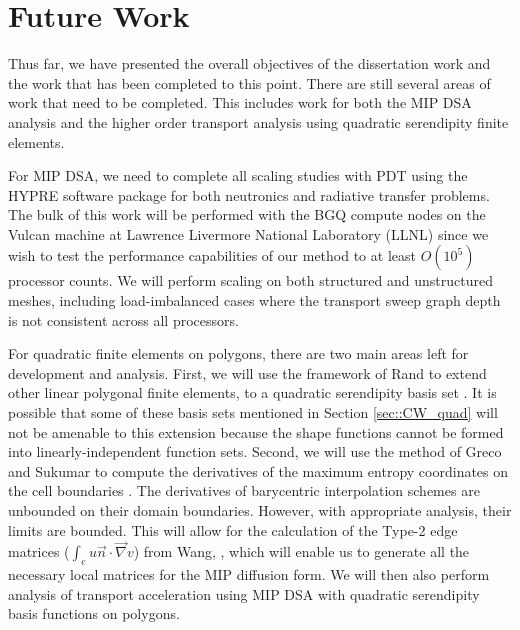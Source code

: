 \documentclass[11pt]{article}
\begin{document}
\section{Future Work}
\label{sec::Future_Work}

Thus far, we have presented the overall objectives of the dissertation work and the work that has been completed to this point. There are still several areas of work that need to be completed. This includes work for both the MIP DSA analysis and the higher order transport analysis using quadratic serendipity finite elements.

For MIP DSA, we need to complete all scaling studies with PDT using the HYPRE software package for both neutronics and radiative transfer problems. The bulk of this work will be performed with the BGQ compute nodes on the Vulcan machine at Lawrence Livermore National Laboratory (LLNL) since we wish to test the performance capabilities of our method to at least $O(10^5)$ processor counts. We will perform scaling on both structured and unstructured meshes, including load-imbalanced cases where the transport sweep graph depth is not consistent across all processors.


For quadratic finite elements on polygons, there are two main areas left for development and analysis. First, we will use the framework of Rand to extend other linear polygonal finite elements, to a quadratic serendipity basis set \cite{rand2014quadratic}. It is possible that some of these basis sets mentioned in Section \ref{sec::CW_quad} will not be amenable to this extension because the shape functions cannot be formed into linearly-independent function sets. Second, we will use the method of Greco and Sukumar to compute the derivatives of the maximum entropy coordinates on the cell boundaries \cite{greco2013derivatives}. The derivatives of barycentric interpolation schemes are unbounded on their domain boundaries. However, with appropriate analysis, their limits are bounded. This will allow for the calculation of the Type-2 edge matrices ($\int_{e} u \vec{n} \cdot \vec{\nabla} v$) from Wang, \cite{wang2009adaptive}, which will enable us to generate all the necessary local matrices for the MIP diffusion form. We will then also perform analysis of transport acceleration using MIP DSA with quadratic serendipity basis functions on polygons.

\end{document}
